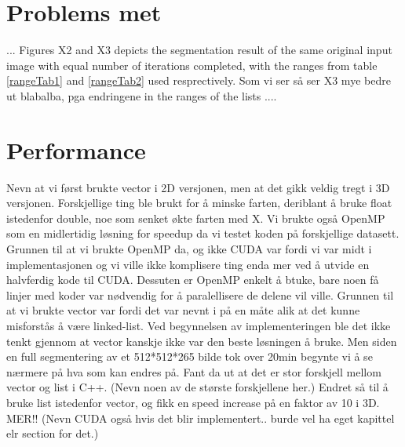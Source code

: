 \section{Problems met}
...
Figures X2 and X3 depicts the segmentation result of the same original input image with equal number of iterations completed, with the ranges from table  \ref{rangeTab1} and \ref{rangeTab2} used resprectively. Som vi ser så ser X3 mye bedre ut blabalba, pga endringene in the ranges of the lists
....

\section{Performance}
Nevn at vi først brukte vector i 2D versjonen, men at det gikk veldig tregt i 3D versjonen. Forskjellige ting ble brukt for å minske farten, deriblant å bruke float istedenfor double, noe som senket økte farten med X. Vi brukte også OpenMP som en midlertidig løsning for speedup da vi testet koden på forskjellige datasett. Grunnen til at vi brukte OpenMP da, og ikke CUDA var fordi vi var midt i implementasjonen og vi ville ikke komplisere ting enda mer ved å utvide en halvferdig kode til CUDA. Dessuten er OpenMP enkelt å btuke, bare noen få linjer med koder var nødvendig for å paralellisere de delene vil ville. Grunnen til at vi brukte vector var fordi det var nevnt i \cite{lankton09} på en måte alik at det kunne misforstås å være linked-list. Ved begynnelsen av implementeringen ble det ikke tenkt gjennom at vector kanskje ikke var den beste løsningen å bruke. Men siden en full segmentering av et 512*512*265 bilde tok over 20min begynte vi å se nærmere på hva som kan endres på. Fant da ut at det er stor forskjell mellom vector og list i C++. (Nevn noen av de største forskjellene her.) Endret så til å bruke list istedenfor vector, og fikk en speed increase på en faktor av 10 i 3D. MER!! (Nevn CUDA også hvis det blir implementert.. burde vel ha eget kapittel elr section for det.) 


